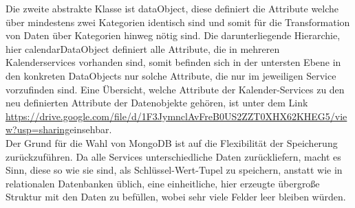 Die zweite abstrakte Klasse ist dataObject, diese definiert die Attribute welche über mindestens zwei Kategorien identisch sind und somit für die Transformation von Daten über Kategorien hinweg nötig sind. Die darunterliegende Hierarchie, hier calendarDataObject definiert alle Attribute, die in mehreren Kalenderservices vorhanden sind, somit befinden sich in der untersten Ebene in den konkreten DataObjects nur solche Attribute, die nur im jeweiligen Service vorzufinden sind. Eine Übersicht, welche Attribute der Kalender-Services zu den neu definierten Attribute der Datenobjekte gehören, ist unter dem Link \glqq \url{https://drive.google.com/file/d/1F3JymnclAvFreB0US2ZZT0XHX62KHEG5/view?usp=sharing}\grqq einsehbar. \\
Der Grund für die Wahl von MongoDB ist auf die Flexibilität der Speicherung zurückzuführen. Da alle Services unterschiedliche Daten zurückliefern, macht es Sinn, diese so wie sie sind, als Schlüssel-Wert-Tupel zu speichern, anstatt wie in relationalen Datenbanken üblich, eine einheitliche, hier erzeugte übergroße Struktur mit den Daten zu befüllen, wobei sehr viele Felder leer bleiben würden. \\






